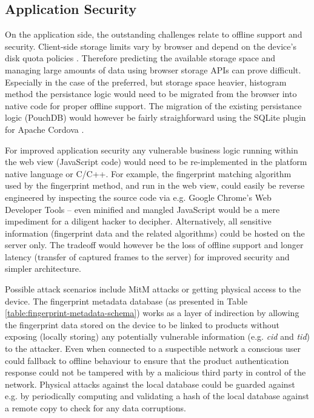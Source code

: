 \documentclass[thesis.tex]{subfiles}
\begin{document}
\subsection{Application Security}
\enlargethispage{1\baselineskip}

On the application side, the outstanding challenges relate to offline support and security. Client-side storage limits vary by browser and depend on the device's disk quota policies \cite{mobile-browser-quota}. Therefore predicting the available storage space and managing large amounts of data using browser storage APIs can prove difficult. Especially in the case of the preferred, but storage space heavier, histogram method the persistance logic would need to be migrated from the browser into native code for proper offline support. The migration of the existing persistance logic (PouchDB) would however be fairly straighforward using the SQLite plugin for Apache Cordova \cite{apache-cordova-sqlite}.

For improved application security any vulnerable business logic running within the web view (JavaScript code) would need to be re-implemented in the platform native language or C/C++. For example, the fingerprint matching algorithm used by the fingerprint method, and run in the web view, could easily be reverse engineered by inspecting the source code via e.g. Google Chrome's Web Developer Tools -- even minified and mangled JavaScript would be a mere impediment for a diligent hacker to decipher. Alternatively, all sensitive information (fingerprint data and the related algorithms) could be hosted on the server only. The tradeoff would however be the loss of offline support and longer latency (transfer of captured frames to the server) for improved security and simpler architecture.

Possible attack scenarios include MitM attacks or getting physical access to the device. The fingerprint metadata database (as presented in Table \ref{table:fingerprint-metadata-schema}) works as a layer of indirection by allowing the fingerprint data stored on the device to be linked to products without exposing (locally storing) any potentially vulnerable information (e.g. \emph{cid} and \emph{tid}) to the attacker. Even when connected to a suspectible network a conscious user could fallback to offline behaviour to ensure that the product authentication response could not be tampered with by a malicious third party in control of the network. Physical attacks against the local database could be guarded against e.g. by periodically computing and validating a hash of the local database against a remote copy to check for any data corruptions.
\end{document}
